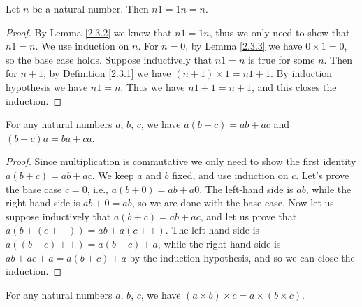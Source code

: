 \begin{additional corollary}\label{ac 2.3.4}
Let \(n\) be a natural number.
Then \(n1 = 1n = n\).
\end{additional corollary}

\begin{proof}
    By Lemma \ref{2.3.2} we know that \(n1 = 1n\), thus we only need to show that \(n1 = n\).
    We use induction on \(n\).
    For \(n=0\), by Lemma \ref{2.3.3} we have \(0 \times 1 = 0\), so the base case holds.
    Suppose inductively that \(n1 = n\) is true for some \(n\).
    Then for \(n + 1\), by Definition \ref{2.3.1} we have \((n + 1) \times 1 = n1 + 1\).
    By induction hypothesis we have \(n1 = n\).
    Thus we have \(n1 + 1 = n + 1\), and this closes the induction.
\end{proof}

\begin{proposition}\label{2.3.4}
    For any natural numbers \(a\), \(b\), \(c\), we have \(a(b + c) = ab + ac\) and \((b + c)a = ba + ca\).
\end{proposition}

\begin{proof}
    Since multiplication is commutative we only need to show the first identity \(a(b + c) = ab + ac\).
    We keep \(a\) and \(b\) fixed, and use induction on \(c\).
    Let's prove the base case \(c = 0\), i.e., \(a(b + 0) = ab + a0\).
    The left-hand side is \(ab\), while the right-hand side is \(ab + 0 = ab\), so we are done with the base case.
    Now let us suppose inductively that \(a(b + c) = ab + ac\), and let us prove that \(a(b + (c++)) = ab + a(c++)\).
    The left-hand side is \(a((b + c)++) = a(b + c) + a\), while the right-hand side is \(ab + ac + a = a(b + c) + a\) by the induction hypothesis, and so we can close the induction.
\end{proof}

\begin{proposition}\label{2.3.5}
    For any natural numbers \(a\), \(b\), \(c\), we have \((a \times b) \times c = a \times (b \times c)\).
\end{proposition}

